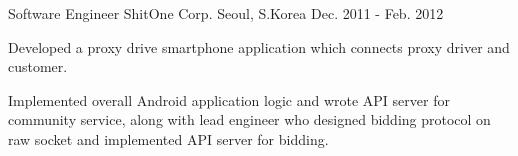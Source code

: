 \begin{cventries}
  \cventry
  {Software Engineer} %
  {ShitOne Corp.} %
  {Seoul, S.Korea} %
  {Dec. 2011 - Feb. 2012} %
  {
    \begin{cvitems} %
      \item {Developed a proxy drive smartphone application which connects proxy driver and customer.}
      \item {Implemented overall Android application logic and wrote API server for community service, along with lead engineer who designed bidding protocol on raw socket and implemented API server for bidding.}
    \end{cvitems}
  }

\end{cventries}
